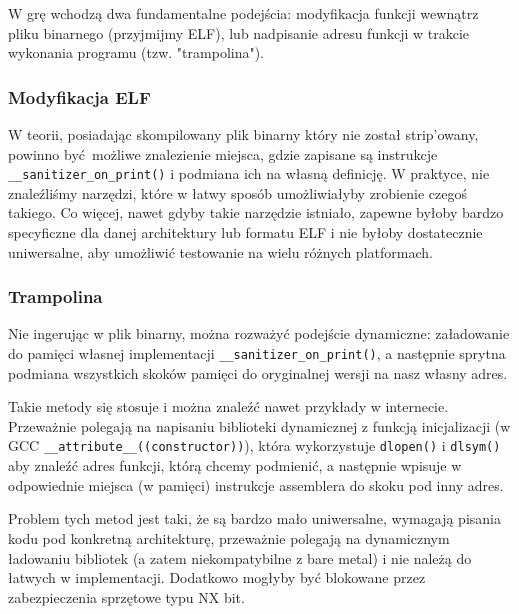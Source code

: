 \documentclass[../main.tex]{subfiles}
\begin{document}
W grę wchodzą dwa fundamentalne podejścia: modyfikacja funkcji wewnątrz pliku
binarnego (przyjmijmy ELF), lub nadpisanie adresu funkcji w trakcie wykonania
programu (tzw. "trampolina").

\subsubsection{Modyfikacja ELF}
W teorii, posiadając skompilowany plik binarny który nie został strip'owany,
powinno być możliwe znalezienie miejsca, gdzie zapisane są instrukcje \\
\texttt{__sanitizer_on_print()} i podmiana ich na własną definicję. W
praktyce, nie znaleźliśmy narzędzi, które w łatwy sposób umożliwiałyby
zrobienie czegoś takiego. Co więcej, nawet gdyby takie narzędzie istniało,
zapewne byłoby bardzo specyficzne dla danej architektury lub formatu ELF i nie
byłoby dostatecznie uniwersalne, aby umożliwić testowanie na wielu różnych
platformach.

\subsubsection{Trampolina}
Nie ingerując w plik binarny, można rozważyć podejście dynamiczne: załadowanie
do pamięci własnej implementacji \texttt{__sanitizer_on_print()}, a
następnie sprytna podmiana wszystkich skoków pamięci do oryginalnej wersji na
nasz własny adres.

Takie metody się stosuje i można znaleźć nawet przykłady w internecie.
Przeważnie polegają na napisaniu biblioteki dynamicznej z funkcją inicjalizacji
(w GCC \texttt{__attribute__((constructor))}), która wykorzystuje
\texttt{dlopen()} i \texttt{dlsym()} aby znaleźć adres funkcji,
którą chcemy podmienić, a następnie wpisuje w odpowiednie miejsca (w pamięci)
instrukcje assemblera do skoku pod inny adres.

Problem tych metod jest taki, że są bardzo mało uniwersalne, wymagają pisania
kodu pod konkretną architekturę, przeważnie polegają na dynamicznym ładowaniu
bibliotek (a zatem niekompatybilne z bare metal) i nie należą do łatwych w
implementacji. Dodatkowo mogłyby być blokowane przez zabezpieczenia sprzętowe
typu NX bit.
\end{document}
